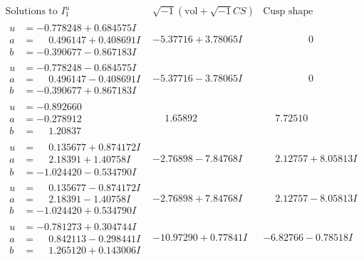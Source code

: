 \documentclass[1p]{elsarticle_modified}
\theoremstyle{definition}
\newcommand{\I}{\sqrt{-1}}
\begin{document}
$$\begin{array}{c|c|c}  
\text{Solutions to }I^u_{1}& \I (\text{vol} + \sqrt{-1}CS) & \text{Cusp shape}\\
 \hline 
\begin{aligned}
u &= -0.778248 + 0.684575 I \\
a &= \phantom{-}0.496147 + 0.408691 I \\
b &= -0.390677 - 0.867183 I\end{aligned}
 & -5.37716 + 3.78065 I & \phantom{-0.000000 } 0 \\ \hline\begin{aligned}
u &= -0.778248 - 0.684575 I \\
a &= \phantom{-}0.496147 - 0.408691 I \\
b &= -0.390677 + 0.867183 I\end{aligned}
 & -5.37716 - 3.78065 I & \phantom{-0.000000 } 0 \\ \hline\begin{aligned}
u &= -0.892660\phantom{ +0.000000I} \\
a &= -0.278912\phantom{ +0.000000I} \\
b &= \phantom{-}1.20837\phantom{ +0.000000I}\end{aligned}
 & \phantom{-}1.65892\phantom{ +0.000000I} & \phantom{-}7.72510\phantom{ +0.000000I} \\ \hline\begin{aligned}
u &= \phantom{-}0.135677 + 0.874172 I \\
a &= \phantom{-}2.18391 + 1.40758 I \\
b &= -1.024420 - 0.534790 I\end{aligned}
 & -2.76898 - 7.84768 I & \phantom{-}2.12757 + 8.05813 I \\ \hline\begin{aligned}
u &= \phantom{-}0.135677 - 0.874172 I \\
a &= \phantom{-}2.18391 - 1.40758 I \\
b &= -1.024420 + 0.534790 I\end{aligned}
 & -2.76898 + 7.84768 I & \phantom{-}2.12757 - 8.05813 I \\ \hline\begin{aligned}
u &= -0.781273 + 0.304744 I \\
a &= \phantom{-}0.842113 - 0.298441 I \\
b &= \phantom{-}1.265120 + 0.143006 I\end{aligned}
 & -10.97290 + 0.77841 I & -6.82766 - 0.78518 I \\ \hline\begin{aligned}

\end{aligned}
\end{array}$$
\end{document}
